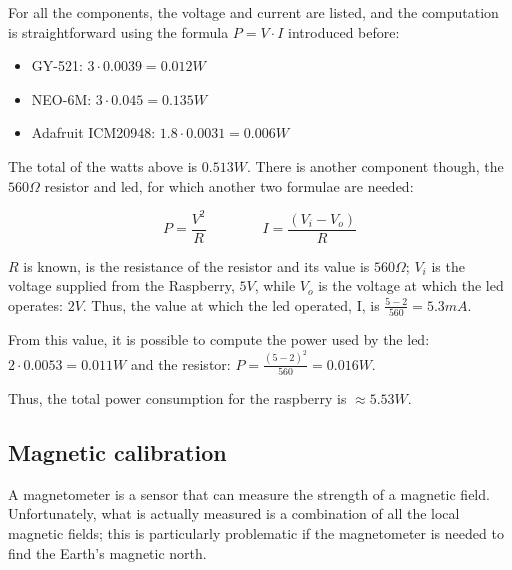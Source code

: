 \documentclass[]{article}
\begin{document}
For all the components, the voltage and current are listed, and the computation is straightforward using the formula $P=V\cdot I$ introduced before:

\begin{itemize}
	\item GY-521: $3 \cdot 0.0039 = 0.012W$
	\item NEO-6M: $3 \cdot 0.045 = 0.135W$
	\item Adafruit ICM20948: $1.8 \cdot 0.0031 = 0.006W$
\end{itemize}

The total of the watts above is $0.513W$. There is another component though, the $560\Omega$ resistor and led, for which another two formulae are needed:

$$ P = \frac{V^2}{R} \qquad\qquad I = \frac{(V_i - V_o)}{R}$$

$R$ is known, is the resistance of the resistor and its value is $560\Omega$; $V_i$ is the voltage supplied from the Raspberry, $5V$, while $V_o$ is the voltage at which the led operates: $2V$. Thus, the value at which the led operated, I, is $\frac{5-2}{560} = 5.3mA$.

From this value, it is possible to compute the power used by the led: $2 \cdot 0.0053 = 0.011W$ and the resistor: $P = \frac{(5-2)^2}{560} = 0.016W$.

Thus, the total power consumption for the raspberry is $\approx 5.53 W$.

\subsection{Magnetic calibration}\label{sec:iron_calib}
A magnetometer is a sensor that can measure the strength of a magnetic field. Unfortunately, what is actually measured is a combination of all the local magnetic fields; this is particularly problematic if the magnetometer is needed to find the Earth's magnetic north. 
\end{document}
